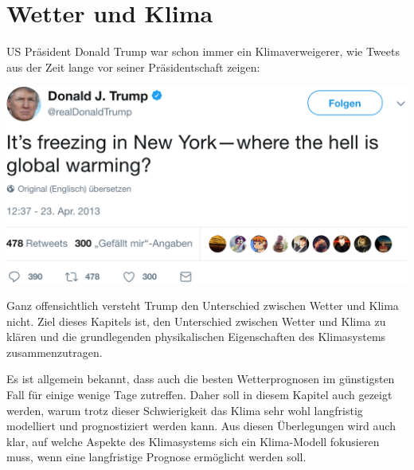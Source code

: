 %
%
%
%
\chapter{Wetter und Klima\label{chapter:wetter und klima}}
US Präsident Donald Trump war schon immer ein Klimaverweigerer, wie Tweets
aus der Zeit lange vor seiner Präsidentschaft zeigen:
\begin{center}
\includegraphics[width=0.6\hsize]{chapters/1/trump.png}
\end{center}
Ganz offensichtlich versteht Trump den Unterschied zwischen Wetter und
Klima nicht.
Ziel dieses Kapitels ist, den Unterschied zwischen Wetter und Klima
zu klären und die grundlegenden physikalischen Eigenschaften des
Klimasystems zusammenzutragen.

Es ist allgemein bekannt, dass auch die besten Wetterprognosen im
günstigsten Fall für einige wenige Tage zutreffen.
Daher soll in diesem Kapitel auch gezeigt werden, warum trotz dieser
Schwierigkeit das Klima sehr wohl langfristig modelliert und prognostiziert
werden kann.
Aus diesen Überlegungen wird auch klar, auf welche Aspekte des Klimasystems
sich ein Klima-Modell fokusieren muss, wenn eine langfristige Prognose
ermöglicht werden soll.





